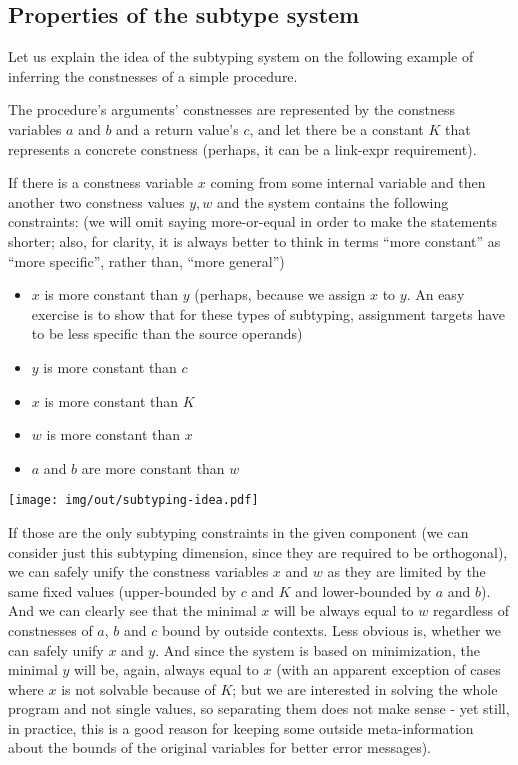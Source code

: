 \subsection{Properties of the subtype system}
\label{subtyping-idea}

Let us explain the idea of the subtyping system on the following example of inferring the constnesses of a simple procedure.

The procedure's arguments' constnesses are represented by the constness variables $a$ and $b$ and a return value's $c$, and let there be a constant $K$ that represents a concrete constness (perhaps, it can be a link-expr requirement).

If there is a constness variable $x$ coming from some internal variable and then another two constness values $y, w$ and the system contains the following constraints: (we will omit saying more-or-equal in order to make the statements shorter; also, for clarity, it is always better to think in terms ``more constant'' as ``more specific'', rather than, ``more general'')

\begin{itemize}
    \item $x$ is more constant than $y$ (perhaps, because we assign $x$ to $y$. An easy exercise is to show that for these types of subtyping, assignment targets have to be less specific than the source operands)
    \item $y$ is more constant than $c$
    \item $x$ is more constant than $K$
    \item $w$ is more constant than $x$
    \item $a$ and $b$ are more constant than $w$
\end{itemize}

\centerline{\texttt{[image: img/out/subtyping-idea.pdf]}}

If those are the only subtyping constraints in the given component (we can consider just this subtyping dimension, since they are required to be orthogonal), we can safely unify the constness variables $x$ and $w$ as they are limited by the same fixed values (upper-bounded by $c$ and $K$ and lower-bounded by $a$ and $b$). And we can clearly see that the minimal $x$ will be always equal to $w$ regardless of constnesses of $a$, $b$ and $c$ bound by outside contexts. Less obvious is, whether we can safely unify $x$ and $y$. And since the system is based on minimization, the minimal $y$ will be, again, always equal to $x$ (with an apparent exception of cases where $x$ is not solvable because of $K$; but we are interested in solving the whole program and not single values, so separating them does not make sense - yet still, in practice, this is a good reason for keeping some outside meta-information about the bounds of the original variables for better error messages).

